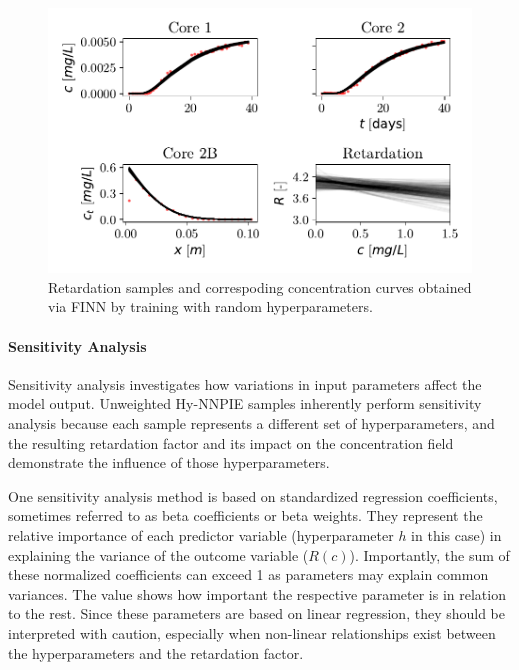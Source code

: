 \begin{figure}[h]
    \centering
    \includegraphics{figs/finn_span_samples.pdf}
    \caption{Retardation samples and correspoding concentration curves obtained via FINN by training with random hyperparameters.}
    \label{fig:span_samples}
\end{figure}



\paragraph{Sensitivity Analysis}
\label{sec:sensitivity}
Sensitivity analysis investigates how variations in input parameters affect the model output. Unweighted Hy-NNPIE samples inherently perform sensitivity analysis because each sample represents a different set of hyperparameters, and the resulting retardation factor and its impact on the concentration field demonstrate the influence of those hyperparameters.

One sensitivity analysis method is based on standardized regression coefficients, sometimes referred to as beta coefficients or beta weights. They represent the relative importance of each predictor variable (hyperparameter $h$ in this case) in explaining the variance of the outcome variable ($R(c)$).
Importantly, the sum of these normalized coefficients can exceed 1 as parameters may explain common variances. The value shows how important the respective parameter is in relation to the rest.
Since these parameters are based on linear regression, they should be interpreted with caution, especially when non-linear relationships exist between the hyperparameters and the retardation factor. %

